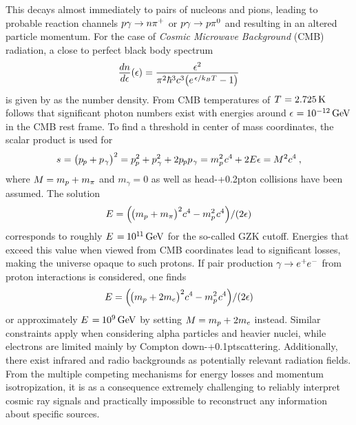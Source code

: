 This decays almost immediately to pairs of nucleons and pions, leading to probable reaction channels
$p\gamma \rightarrow \kern-0.1pt n\smash{\pi^+}$ or $p\gamma \rightarrow \kern+0.2pt p \smash{\pi^0}$ and resulting in an altered
particle momentum. For the case of \emph{Cosmic Microwave Background} (CMB) radiation, a close to perfect black
body spectrum
\begin{equation}
	\frac{\raisebox{-0.3ex}{$dn$}}{\raisebox{0.15ex}{$d\epsilon$}} (\epsilon) \kern+0.2pt =
	\frac{\raisebox{-0.3ex}{$\epsilon^2$}}{\pi^2 \hbar^3 c^3 \bigl( e^{\kern+1.0pt \epsilon / k_B T} - 1 \bigr)}
\end{equation}
is given by \cite{Gaisser_2016} as the number density. From CMB temperatures of $\kern+0.5pt T \kern+0.5pt = \qty{2.725}{\kelvin}$ follows that
significant photon numbers exist with energies around $\epsilon \kern+0.5pt = \qty{e-12}{\giga\electronvolt}$ in the CMB rest frame. 
To find a threshold in center of mass coordinates, the scalar product is used for
\begin{equation}
	s \kern+0.3pt = \bigl( p_{\kern-0.5pt p} + p_{\kern+0.5pt \gamma} \bigr)^2 =
	p_{\kern-0.5pt p}^2 + p_{\kern+0.5pt \gamma}^2 + 2 p_{\kern-0.5pt p} p_{\kern+0.5pt \gamma} =
	m_p^2 \kern+0.8pt c^4 \kern-0.2pt + 2 E \epsilon = \kern-0.2pt M^2c^4 \: ,
\end{equation}
where $M \kern-0.3pt = m_p + \kern+0.3pt m_\pi$ and $m_\gamma = 0$ as well as head-{\kern+0.2pt}on collisions have been assumed. The solution
\begin{equation}
	E = \Bigl( \kern-1.0pt \bigl( m_p + m_\pi \bigr)^2 c^4 \kern-0.2pt - m_p^2 \kern+0.8pt c^4 \Bigr) / (2\epsilon)
\end{equation}
corresponds to roughly $E \kern+1.0pt = \kern-0.5pt 10^{1 \kern-0.3pt 1} \kern+1.5pt \unit{\giga\electronvolt}$ for the so-called
GZK cutoff. Energies that exceed this value when viewed from CMB coordinates lead to significant losses, making the universe
opaque to such protons. If pair production $\gamma \kern-0.5pt \rightarrow \smash{e^+ \kern-0.5pt e^-}$ from proton interactions is
considered, one finds
\begin{equation}
	E = \Bigl( \kern-1.0pt \bigl( m_p + 2m_e \bigr)^2 c^4 \kern-0.2pt - m_p^2 \kern+0.8pt c^4 \Bigr) / (2\epsilon)
\end{equation}
or approximately $E \kern+1.0pt = \kern-0.5pt \qty{e+9}{\giga\electronvolt}$ by setting $M \kern-0.3pt = m_p + \kern+0.3pt 2m_e$
instead. Similar constraints apply when considering alpha particles and heavier nuclei, while electrons are limited mainly by Compton
down-{\kern+0.1pt}scattering. Additionally, there exist infrared and radio backgrounds as potentially relevant radiation fields. From
the multiple competing mechanisms for energy losses and momentum isotropization, it is as a consequence extremely challenging
to reliably interpret cosmic ray signals and practically impossible to reconstruct any information about specific sources.



